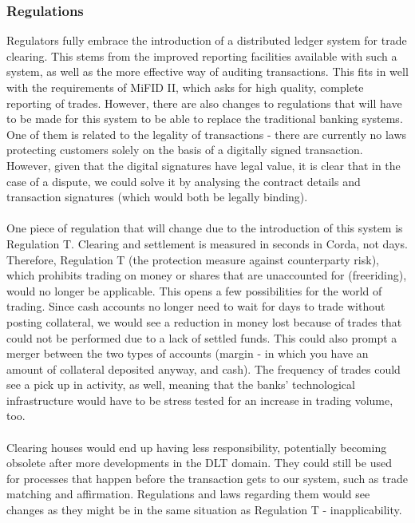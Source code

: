 \documentclass[12pt,twoside]{article}
\begin{document}
\subsubsection{Regulations}
\label{sub:reg}
Regulators fully embrace the introduction of a distributed ledger system for trade clearing. This stems from the improved reporting facilities available with such a system, as well as the more effective way of auditing transactions. This fits in well with the requirements of MiFID II, which asks for high quality, complete reporting of trades. However, there are also changes to regulations that will have to be made for this system to be able to replace the traditional banking systems. One of them is related to the legality of transactions - there are currently no laws protecting customers solely on the basis of a digitally signed transaction. However, given that the digital signatures have legal value, it is clear that in the case of a dispute, we could solve it by analysing the contract details and transaction signatures (which would both be legally binding).
\\ \\
One piece of regulation that will change due to the introduction of this system is Regulation T. Clearing and settlement is measured in seconds in Corda, not days. Therefore, Regulation T (the protection measure against counterparty risk), which prohibits trading on money or shares that are unaccounted for (freeriding), would no longer be applicable. This opens a few possibilities for the world of trading. Since cash accounts no longer need to wait for days to trade without posting collateral, we would see a reduction in money lost because of trades that could not be performed due to a lack of settled funds. This could also prompt a merger between the two types of accounts (margin - in which you have an amount of collateral deposited anyway, and cash). The frequency of trades could see a pick up in activity, as well, meaning that the banks' technological infrastructure would have to be stress tested for an increase in trading volume, too. 
\\ \\
Clearing houses would end up having less responsibility, potentially becoming obsolete after more developments in the DLT domain. They could still be used for processes that happen before the transaction gets to our system, such as trade matching and affirmation. Regulations and laws regarding them would see changes as they might be in the same situation as Regulation T - inapplicability. 
\newpage
\end{document}
